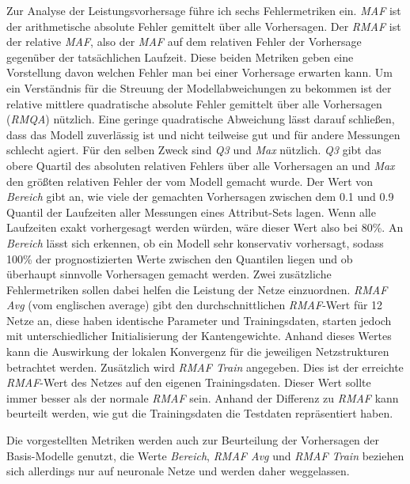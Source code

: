 \documentclass[
	12pt,
	a4paper,
	BCOR10mm,
	DIV14,
	listof=totoc,
	bibliography=totoc,
	headsepline
]{scrreprt}
\begin{document}
Zur Analyse der Leistungsvorhersage führe ich sechs Fehlermetriken ein.
\textit{MAF} ist der arithmetische absolute Fehler gemittelt über alle Vorhersagen.
Der \textit{RMAF} ist der relative \textit{MAF}, also der \textit{MAF} auf dem relativen Fehler der Vorhersage gegenüber der tatsächlichen Laufzeit.
Diese beiden Metriken geben eine Vorstellung davon welchen Fehler man bei einer Vorhersage erwarten kann.
Um ein Verständnis für die Streuung der Modellabweichungen zu bekommen ist der relative mittlere quadratische absolute Fehler gemittelt über alle Vorhersagen (\textit{RMQA}) nützlich.
Eine geringe quadratische Abweichung lässt darauf schließen, dass das Modell zuverlässig ist und nicht teilweise gut und für andere Messungen schlecht agiert.
Für den selben Zweck sind \textit{Q3} und \textit{Max} nützlich. \textit{Q3} gibt das obere Quartil des absoluten relativen Fehlers über alle Vorhersagen an und \textit{Max} den größten relativen Fehler der vom Modell gemacht wurde.
Der Wert von \textit{Bereich} gibt an, wie viele der gemachten Vorhersagen zwischen dem 0.1 und 0.9 Quantil der Laufzeiten aller Messungen eines Attribut-Sets lagen. Wenn alle Laufzeiten exakt vorhergesagt werden würden, wäre dieser Wert also bei 80\%. An \textit{Bereich} lässt sich erkennen, ob ein Modell sehr konservativ vorhersagt, sodass 100\% der prognostizierten Werte zwischen den Quantilen liegen und ob überhaupt sinnvolle Vorhersagen gemacht werden.
Zwei zusätzliche Fehlermetriken sollen dabei helfen die Leistung der Netze einzuordnen. \textit{RMAF Avg} (vom englischen average) gibt den durchschnittlichen \textit{RMAF}-Wert für 12 Netze an, diese haben identische Parameter und Trainingsdaten, starten jedoch mit unterschiedlicher Initialisierung der Kantengewichte. Anhand dieses Wertes kann die Auswirkung der lokalen Konvergenz für die jeweiligen Netzstrukturen betrachtet werden.
Zusätzlich wird \textit{RMAF Train} angegeben. Dies ist der erreichte \textit{RMAF}-Wert des Netzes auf den eigenen Trainingsdaten. Dieser Wert sollte immer besser als der normale \textit{RMAF} sein. Anhand der Differenz zu \textit{RMAF} kann beurteilt werden, wie gut die Trainingsdaten die Testdaten repräsentiert haben.

Die vorgestellten Metriken werden auch zur Beurteilung der Vorhersagen der Basis-Modelle genutzt, die Werte \textit{Bereich}, \textit{RMAF Avg} und \textit{RMAF Train} beziehen sich allerdings nur auf neuronale Netze und werden daher weggelassen.
\end{document}
